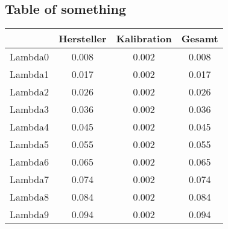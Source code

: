 \documentclass{article}
\begin{document}
\subsection{Table of something}
\begin{tabular}{c|c|c|c}
 &Hersteller&Kalibration&Gesamt\\
\hline
Lambda0&0.008&0.002&0.008\\
Lambda1&0.017&0.002&0.017\\
Lambda2&0.026&0.002&0.026\\
Lambda3&0.036&0.002&0.036\\
Lambda4&0.045&0.002&0.045\\
Lambda5&0.055&0.002&0.055\\
Lambda6&0.065&0.002&0.065\\
Lambda7&0.074&0.002&0.074\\
Lambda8&0.084&0.002&0.084\\
Lambda9&0.094&0.002&0.094\\
\end{tabular}
\end{document}
